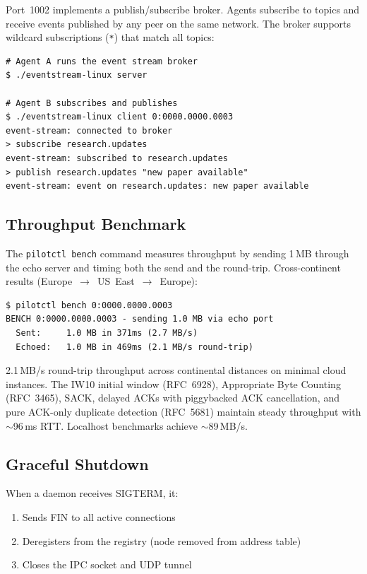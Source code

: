 \documentclass[11pt,a4paper]{article}
\begin{document}
Port~1002 implements a publish/subscribe broker. Agents subscribe to topics and receive events published by any peer on the same network. The broker supports wildcard subscriptions (\texttt{*}) that match all topics:

\begin{lstlisting}[basicstyle=\ttfamily\small]
# Agent A runs the event stream broker
$ ./eventstream-linux server

# Agent B subscribes and publishes
$ ./eventstream-linux client 0:0000.0000.0003
event-stream: connected to broker
> subscribe research.updates
event-stream: subscribed to research.updates
> publish research.updates "new paper available"
event-stream: event on research.updates: new paper available
\end{lstlisting}

\subsection{Throughput Benchmark}

The \texttt{pilotctl bench} command measures throughput by sending 1\,MB through the echo server and timing both the send and the round-trip. Cross-continent results (Europe~$\rightarrow$~US~East~$\rightarrow$~Europe):

\begin{lstlisting}[basicstyle=\ttfamily\small]
$ pilotctl bench 0:0000.0000.0003
BENCH 0:0000.0000.0003 - sending 1.0 MB via echo port
  Sent:     1.0 MB in 371ms (2.7 MB/s)
  Echoed:   1.0 MB in 469ms (2.1 MB/s round-trip)
\end{lstlisting}

2.1\,MB/s round-trip throughput across continental distances on minimal cloud instances. The IW10 initial window (RFC~6928), Appropriate Byte Counting (RFC~3465), SACK, delayed ACKs with piggybacked ACK cancellation, and pure ACK-only duplicate detection (RFC~5681) maintain steady throughput with ${\sim}$96\,ms RTT. Localhost benchmarks achieve ${\sim}$89\,MB/s.

\subsection{Graceful Shutdown}

When a daemon receives SIGTERM, it:
\begin{enumerate}
    \item Sends FIN to all active connections
    \item Deregisters from the registry (node removed from address table)
    \item Closes the IPC socket and UDP tunnel
\end{enumerate}
\end{document}
